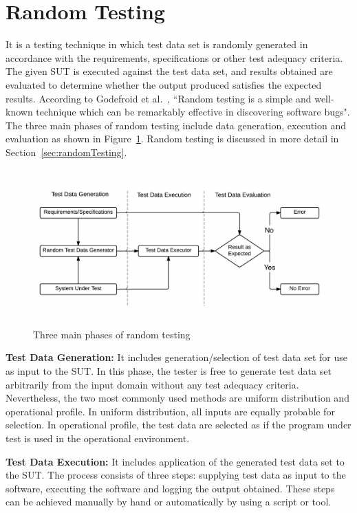  

\section{Random Testing} \label{sec:RT_1}
It is a testing technique in which test data set is randomly generated in accordance with the requirements, specifications or other test adequacy criteria. The given SUT is executed against the test data set, and results obtained are evaluated to determine whether the output produced satisfies the expected results. According to Godefroid et al.~\cite{godefroid2005dart}, ``Random testing is a simple and well-known technique which can be remarkably effective in discovering software bugs". The three main phases of random testing include data generation, execution and evaluation as shown in Figure~\ref{fig:SoftwareTesting1}. Random testing is discussed in more detail in Section~\ref{sec:randomTesting}.
\bigskip
\begin{figure}[H]
	\centering
		\includegraphics[width=15cm, height=6cm ]{chapter1/randomTestingPhases1.png}
		\caption{Three main phases of random testing}
	\label{fig:SoftwareTesting1}
\end{figure}

\textbf{Test Data Generation:} It includes generation/selection of test data set for use as input to the SUT. In this phase, the tester is free to generate test data set arbitrarily from the input domain without any test adequacy criteria. Nevertheless, the two most commonly used methods are uniform distribution and operational profile. In uniform distribution, all inputs are equally probable for selection. In operational profile, the test data are selected as if the program under test is used in the operational environment.

\textbf{Test Data Execution:} It includes application of the generated test data set to the SUT. The process consists of three steps: supplying test data as input to the software, executing the software and logging the output obtained. 
These steps can be achieved manually by hand or automatically by using a script or tool. 

